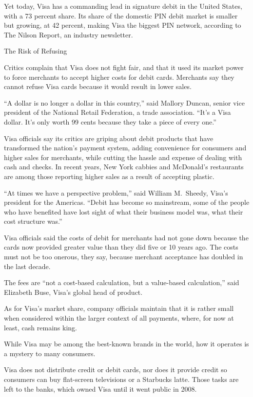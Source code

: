 ﻿\documentclass[12pt]{article}
\begin{document}
Yet today, Visa has a commanding lead in signature debit in the United States, with a 73 percent
share. Its share of the domestic PIN debit market is smaller but growing, at 42 percent, making Visa
the biggest PIN network, according to The Nilson Report, an industry newsletter.

The Risk of Refusing

Critics complain that Visa does not fight fair, and that it used its market power to force merchants
to accept higher costs for debit cards. Merchants say they cannot refuse Visa cards because it would
result in lower sales.

``A dollar is no longer a dollar in this country,'' said Mallory Duncan, senior vice president of
the National Retail Federation, a trade association. ``It's a Visa dollar. It's only worth 99 cents
because they take a piece of every one.''

Visa officials say its critics are griping about debit products that have transformed the nation's
payment system, adding convenience for consumers and higher sales for merchants, while cutting the
hassle and expense of dealing with cash and checks. In recent years, New York cabbies and McDonald's
restaurants are among those reporting higher sales as a result of accepting plastic.

``At times we have a perspective problem,'' said William M.~Sheedy, Visa's president for the
Americas. ``Debit has become so mainstream, some of the people who have benefited have lost sight of
what their business model was, what their cost structure was.''

Visa officials said the costs of debit for merchants had not gone down because the cards now
provided greater value than they did five or 10 years ago. The costs must not be too onerous, they
say, because merchant acceptance has doubled in the last decade.

The fees are ``not a cost-based calculation, but a value-based calculation,'' said Elizabeth Buse,
Visa's global head of product.

As for Visa's market share, company officials maintain that it is rather small when considered
within the larger context of all payments, where, for now at least, cash remains king.

While Visa may be among the best-known brands in the world, how it operates is a mystery to many
consumers.

Visa does not distribute credit or debit cards, nor does it provide credit so consumers can buy
flat-screen televisions or a Starbucks latte. Those tasks are left to the banks, which owned Visa
until it went public in 2008.
\end{document}
